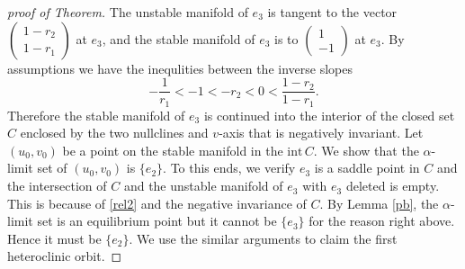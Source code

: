 \documentclass{amsart}
\theoremstyle{definition}
\numberwithin{equation}{section}
\def\ii{{\textrm{int}}\,}
\begin{document}
\begin{proof}[proof of Theorem]
The unstable manifold of $e_3$ is tangent to the vector $\begin{pmatrix} 1-r_2 \\ 1-r_1 \end{pmatrix}$ at $e_3$, and the stable manifold of $e_3$ is to $\begin{pmatrix} 1 \\ -1 \end{pmatrix}$ at $e_3$. By assumptions we have the inequlities between the inverse slopes
\begin{equation}\label{rel8} - \frac{1}{r_1} < -1 < - r_2 < 0 < \frac{1-r_2}{1-r_1}. \end{equation}
Therefore the stable manifold of $e_3$ is continued into the interior of the closed set $C$ enclosed by the two nullclines and $v$-axis that is negatively invariant. Let $(u_0,v_0)$ be a point on the stable manifold in the $\ii C$. We show that the $\alpha$-limit set of $(u_0,v_0)$ is $\{e_2\}$. To this ends, we verify $e_3$ is a saddle point in $C$ and the intersection of $C$ and the unstable manifold of $e_3$ with $e_3$ deleted is empty. This is because of \eqref{rel2} and the negative invariance of $C$. By Lemma \ref{pb}, the $\alpha$-limit set is an equilibrium point but it cannot be $\{e_3\}$ for the reason right above. Hence it must be $\{e_2\}$. We use the similar arguments to claim the first heteroclinic orbit.

% 


\end{proof}
\end{document}
